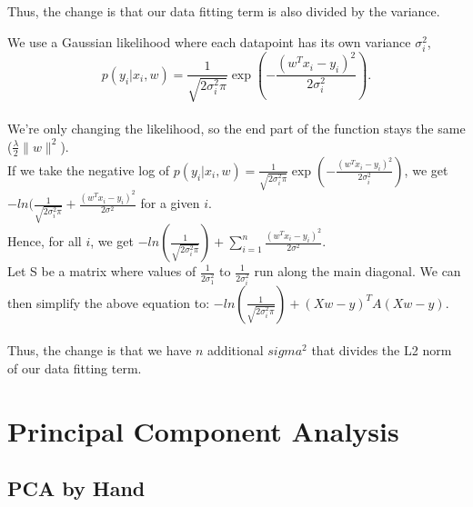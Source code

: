 \documentclass{article}
\def\gre#1{{\color{gre}#1}}
\def\norm#1{\|#1\|}
\begin{document}
{{Thus, the change is that our data fitting term is also divided by the variance.
}
\item We use a Gaussian likelihood where each datapoint has its own variance $\sigma_i^2$,
\[
p(y_i | x_i,w) = \frac{1}{\sqrt{2\sigma_i^2\pi}}\exp\left(-\frac{(w^Tx_i - y_i)^2}{2\sigma_i^2}\right).
\]\\
\gre{
We're only changing the likelihood, so the end part of the function stays the same ($\frac \lambda 2 \norm{w}^2$).
\\
If we take the negative log of $p(y_i | x_i,w) = \frac{1}{\sqrt{2\sigma_i^2\pi}}\exp\left(-\frac{(w^Tx_i - y_i)^2}{2\sigma_i^2}\right)$, we get $-ln(\frac{1}{\sqrt{2\sigma^2_i\pi}} + \frac{(w^Tx_i - y_i)^2}{2\sigma^2}$ for a given $i$.
\\
Hence, for all $i$, we get $-ln(\frac{1}{\sqrt{2\sigma^2_i\pi}}) + \sum_{i=1}^{n}\frac{(w^Tx_i - y_i)^2}{2\sigma^2}$. 
\\
Let S be a matrix where values of $\frac{1}{2\sigma_1^2}$ to $\frac{1}{2\sigma_i^2}$ run along the main diagonal. We can then simplify the above equation to: $-ln(\frac{1}{\sqrt{2\sigma^2_i\pi}}) + (Xw - y)^TA(Xw - y)$.
\\\\
Thus, the change is that we have $n$ additional $sigma^2$ that divides the L2 norm of our data fitting term.
}
}




\section{Principal Component Analysis}

\subsection{PCA by Hand}
\end{document}
